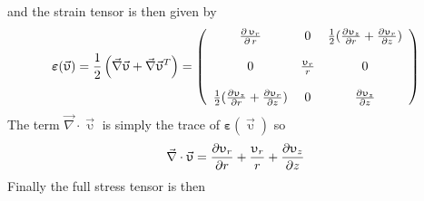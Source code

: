 and the strain tensor is then given by 
\begin{equation}
\label{eq:strain_as} 
{\bm \varepsilon}(\vec{\upupsilon})
=\frac12\left(\vec\nabla \vec{\upupsilon}+
\vec\nabla \vec{\upupsilon}^T\right)
=
\left(
\begin{array}{ccc}
{\partial \, \upupsilon_r \over \partial \, r} &
0 &
\frac12({\partial \upupsilon_{z} \over \partial r} 
+ {\partial \upupsilon_r \over \partial z}) \\ \\
0 & {\upupsilon_r \over r} & 0 \\ \\
\frac12({\partial \upupsilon_{z} \over \partial r} + 
{\partial \upupsilon_r \over \partial z} ) & 0 & 
{\partial \upupsilon_{z} \over \partial z} 
\end{array}
\right)
\end{equation}
The term $\vec\nabla \cdot \vec{\upupsilon}$ is simply the trace of ${\bm \varepsilon}(\vec{\upupsilon})$ so 
\[
\vec\nabla \cdot \vec{\upupsilon}
= {\partial \upupsilon_r \over \partial r} 
+{\upupsilon_r \over r}
+{\partial \upupsilon_{z} \over \partial z}
\]
Finally the full stress tensor is then 
